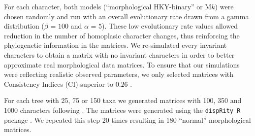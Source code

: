 \documentclass[12pt,letterpaper]{article}
\begin{document}
\noindent For each character, both models (``morphological HKY-binary'' or M$k$) were chosen randomly and run with an overall evolutionary rate drawn from a gamma distribution ($\beta$ = $100$ and $\alpha$ = $5$).
These low evolutionary rate values allowed reduction in the number of homoplasic character changes, thus reinforcing the phylogenetic information in the matrices.
We re-simulated every invariant characters to obtain a matrix with no invariant characters in order to better approximate real morphological data matrices.
To ensure that our simulations were reflecting realistic observed parameters, we only selected matrices with Consistency Indices (CI) superior to $0.26$ \citep{sanderson1989patterns,OReilly20160081}.

For each tree with 25, 75 or 150 taxa we generated matrices with 100, 350 and 1000 characters following \cite{OReilly20160081}.
The matrices were generated using the \texttt{dispRity R} package \citep{thomas_guillerme_2016_55646}.
We repeated this step 20 times resulting in 180 ``normal'' morphological matrices.
\end{document}
